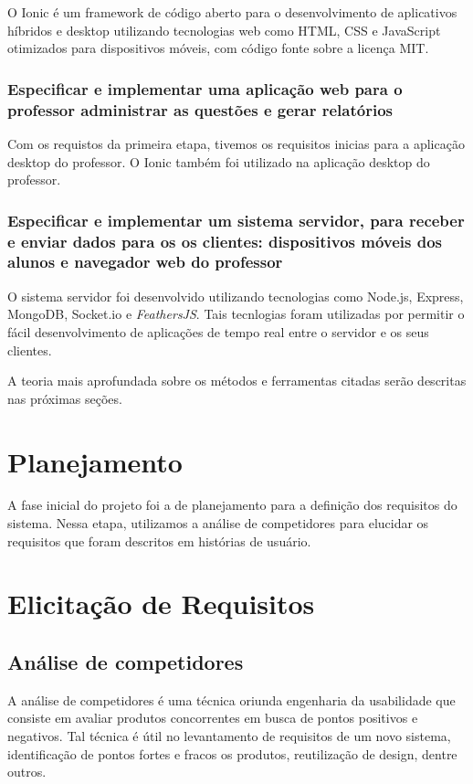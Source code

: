 O Ionic é um framework de código aberto para o desenvolvimento de aplicativos híbridos e desktop utilizando
tecnologias web como HTML, CSS e JavaScript otimizados para dispositivos móveis, com código fonte sobre a licença MIT.

\subsubsection{Especificar e implementar uma aplicação web para o professor administrar as questões e gerar relatórios}

Com os requistos da primeira etapa, tivemos os requisitos inicias para a aplicação desktop do professor.
O Ionic também foi utilizado na aplicação desktop do professor.

\subsubsection{Especificar e implementar um sistema servidor, para receber e
    enviar dados para os os clientes: dispositivos móveis dos alunos e navegador
    web do professor}

O sistema servidor foi desenvolvido utilizando tecnologias como Node.js, Express, MongoDB, Socket.io e \textit{FeathersJS}.
Tais tecnlogias foram utilizadas por permitir o fácil desenvolvimento de aplicações
de tempo real entre o servidor e os seus clientes.

A teoria mais aprofundada sobre os métodos e ferramentas citadas serão descritas nas próximas seções.

\section{Planejamento}

A fase inicial do projeto foi a de planejamento para a definição dos
requisitos do sistema. Nessa etapa, utilizamos a análise de competidores
para elucidar os requisitos que foram descritos em histórias de usuário.

\section{Elicitação de Requisitos}

\subsection{Análise de competidores}

A análise de competidores é uma técnica oriunda engenharia da usabilidade
que consiste em avaliar produtos concorrentes em busca de pontos positivos e
negativos. Tal técnica é útil no levantamento de requisitos de um novo sistema,
identificação de pontos fortes e fracos os produtos, reutilização de design, dentre outros.

